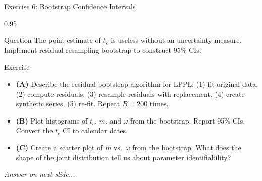\documentclass[9pt, aspectratio=169, t]{beamer}
\begin{document}
\begin{frame}{Exercise 6: Bootstrap Confidence Intervals}
    \begin{cminipage}{0.95\textwidth}
    \begin{alertblock}{Question}
        The point estimate of $t_c$ is useless without an uncertainty measure.
        Implement residual resampling bootstrap to construct 95\% CIs.
    \end{alertblock}

    \vspace{0.15cm}

    \begin{block}{Exercise}
        \begin{itemize}\setlength{\itemsep}{3pt}
            \item \textcolor{MainBlue}{\textbf{(A)}} Describe the residual bootstrap algorithm for LPPL: (1) fit original data, (2) compute residuals, (3) resample residuals with replacement, (4) create synthetic series, (5) re-fit. Repeat $B = 200$ times.
            \item \textcolor{MainBlue}{\textbf{(B)}} Plot histograms of $t_c$, $m$, and $\omega$ from the bootstrap. Report 95\% CIs. Convert the $t_c$ CI to calendar dates.
            \item \textcolor{MainBlue}{\textbf{(C)}} Create a scatter plot of $m$ vs.\ $\omega$ from the bootstrap. What does the shape of the joint distribution tell us about parameter identifiability?
        \end{itemize}
    \end{block}

    \vspace{0.1cm}

    \begin{center}
        \textit{Answer on next slide...}
    \end{center}
    \end{cminipage}
\end{frame}
\end{document}
